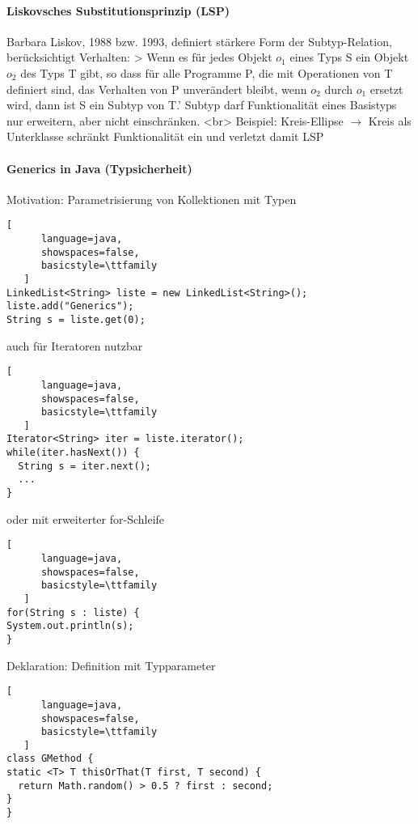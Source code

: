\documentclass[10pt]{article}
\begin{document}
\paragraph{Liskovsches Substitutionsprinzip (LSP)}
Barbara Liskov, 1988 bzw. 1993, definiert stärkere Form der Subtyp-Relation, berücksichtigt Verhalten:
> Wenn es für jedes Objekt $o_1$ eines Typs S ein Objekt $o_2$ des Typs T gibt, so dass für alle Programme P, die mit Operationen von T definiert sind, das Verhalten von P unverändert bleibt, wenn $o_2$ durch $o_1$ ersetzt wird, dann ist S ein Subtyp von T.'
Subtyp darf Funktionalität eines Basistyps nur erweitern, aber nicht einschränken. <br>
Beispiel: Kreis-Ellipse $\rightarrow$ Kreis als Unterklasse schränkt Funktionalität ein und verletzt damit LSP

\paragraph{Generics in Java (Typsicherheit)}
Motivation: Parametrisierung von Kollektionen mit Typen
\begin{lstlisting}[
      language=java,
      showspaces=false,
      basicstyle=\ttfamily
   ]
LinkedList<String> liste = new LinkedList<String>();
liste.add("Generics");
String s = liste.get(0);
\end{lstlisting}

auch für Iteratoren nutzbar
\begin{lstlisting}[
      language=java,
      showspaces=false,
      basicstyle=\ttfamily
   ]
Iterator<String> iter = liste.iterator();
while(iter.hasNext()) {
  String s = iter.next();
  ...
}
\end{lstlisting}

oder mit erweiterter for-Schleife
\begin{lstlisting}[
      language=java,
      showspaces=false,
      basicstyle=\ttfamily
   ]
for(String s : liste) {
System.out.println(s);
}
\end{lstlisting}


Deklaration: Definition mit Typparameter
\begin{lstlisting}[
      language=java,
      showspaces=false,
      basicstyle=\ttfamily
   ]
class GMethod {
static <T> T thisOrThat(T first, T second) {
  return Math.random() > 0.5 ? first : second;
}
}
\end{lstlisting}
\end{document}
